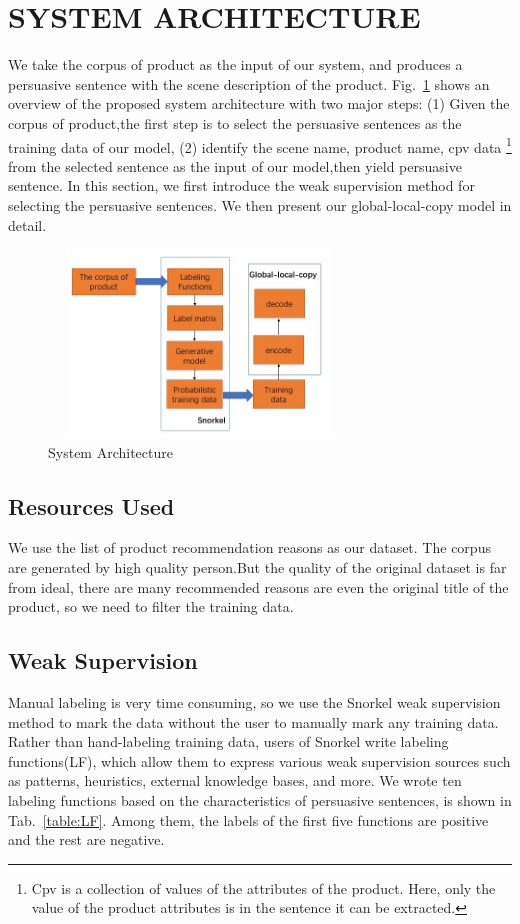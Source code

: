 \documentclass[sigconf]{acmart}
\begin{document}


\section{SYSTEM ARCHITECTURE}\label{sec:architecture}
We take the corpus of product as the input of our system, and produces a persuasive sentence with the scene description of the product. Fig.~\ref{fig:system-architecture} shows an overview of the proposed system architecture with two major steps: (1) Given the corpus of product,the first step is to select the persuasive sentences as the training data of our model, (2) identify the scene name, product name, cpv data \footnote{Cpv is a collection of values of the attributes of the product. Here, only the value of the product attributes is in the sentence it can be extracted.} from the selected sentence as the input of our model,then yield persuasive sentence. In this section, we first introduce the weak supervision method for selecting the persuasive sentences. We then present our global-local-copy model in detail.  

\begin{figure}
    \centering
    \includegraphics[width=8cm,height=5cm]{system-architecture.jpg}
\caption{System Architecture}\label{fig:system-architecture}
\end{figure}

\subsection{Resources Used}
We use the list of product recommendation reasons as our dataset. The corpus are generated by high quality person.But the quality of the original dataset is far from ideal, there are many recommended reasons are even the original title of the product, so we need to filter the training data.

\subsection{Weak Supervision}
Manual labeling is very time consuming, so we use the Snorkel \cite{ratner2017snorkel} weak supervision method to mark the data without the user to manually mark any training data. Rather than hand-labeling training data, users of Snorkel write labeling functions(LF), which allow them to express various weak supervision sources such as patterns, heuristics, external knowledge bases, and more. We wrote ten labeling functions based on the characteristics of persuasive sentences, is shown in Tab.~\ref{table:LF}. Among them, the labels of the first five functions are positive and the rest are negative.
\end{document}
